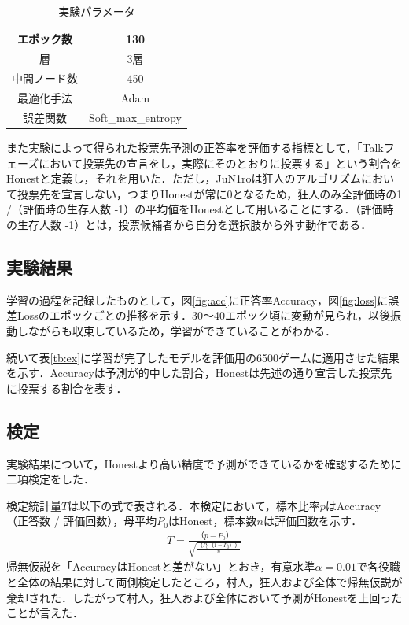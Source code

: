 \documentclass{jarticle}
\begin{document}
\begin{table}[t]
    \begin{center}
    \caption{実験パラメータ    \label{tb:param}}
 \begin{tabular}{|c|c|}
 \hline
  エポック数&130\\
  \hline
  層&3層\\
  \hline
  中間ノード数&450\\
  \hline
  最適化手法&Adam\\
  \hline
  誤差関数&Soft\_max\_entropy\\
  \hline
 \end{tabular}
 \end{center}
\end{table}

また実験によって得られた投票先予測の正答率を評価する指標として，「Talkフェーズにおいて投票先の宣言をし，実際にそのとおりに投票する」という割合をHonestと定義し，それを用いた．ただし，JuN1roは狂人のアルゴリズムにおいて投票先を宣言しない，つまりHonestが常に0となるため，狂人のみ全評価時の1 /（評価時の生存人数 -1）の平均値をHonestとして用いることにする．（評価時の生存人数 -1）とは，投票候補者から自分を選択肢から外す動作である．\par

\subsection{実験結果}
学習の過程を記録したものとして，図\ref{fig:acc}に正答率Accuracy，図\ref{fig:loss}に誤差Lossのエポックごとの推移を示す．30～40エポック頃に変動が見られ，以後振動しながらも収束しているため，学習ができていることがわかる．\par
続いて表\ref{tb:ex}に学習が完了したモデルを評価用の6500ゲームに適用させた結果を示す．Accuracyは予測が的中した割合，Honestは先述の通り宣言した投票先に投票する割合を表す．

\subsection{検定}
実験結果について，Honestより高い精度で予測ができているかを確認するために二項検定をした．\par
検定統計量$T$は以下の式で表される．本検定において，標本比率$p$はAccuracy（正答数 / 評価回数），母平均$P_0$はHonest，標本数$n$は評価回数を示す．
\begin{eqnarray}
T = \frac{（p-P_0）}{\sqrt{\frac{（P_0（1-P_0））}{n}}}\nonumber
\end{eqnarray}
\hspace{1zw}帰無仮説を「AccuracyはHonestと差がない」とおき，有意水準$\alpha = 0.01$で各役職と全体の結果に対して両側検定したところ，村人，狂人および全体で帰無仮説が棄却された．したがって村人，狂人および全体において予測がHonestを上回ったことが言えた．
\end{document}
